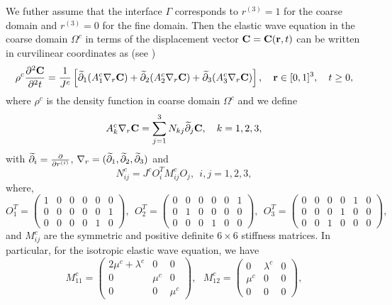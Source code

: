 We futher assume that the interface $\Gamma$ corresponds to $r^{(3)} = 1$ for the coarse domain and $r^{(3)} = 0$ for the fine domain. Then the elastic wave equation in the coarse domain $\Omega^c$ in terms of the displacement vector ${\bf C} = {\bf C}({\bf r}, t)$ can be written in curvilinear coordinates as (see \cite{petersson2015wave})
\begin{align}\label{elastic_curvi}
	\rho^c\frac{\partial^2{\bf C}}{\partial^2 t} = \frac{1}{J^c}\left[\wt{\partial}_1(A_1^c\nabla_r{\bf C}) + \wt{\partial}_2(A_2^c\nabla_r{\bf C}) +\wt{\partial}_3(A_3^c\nabla_r{\bf C}) \right],\ \ \  {\bf r}\in[0,1]^3,\ \ \  t\geq0,
\end{align}
where $\rho^c$ is the density function in coarse domain $\Omega^c$ and we define
\begin{align*} 
A_k^c\nabla_r{\bf C} = \sum_{j = 1}^3 N_{kj}\wt{\partial}_j {\bf C}, \ \ \ k = 1,2,3,
\end{align*}
with $\widetilde{\partial}_i = \frac{\partial}{\partial r^{(i)}}$, $\nabla_r = (\widetilde{\partial}_1,\widetilde{\partial}_2,\widetilde{\partial}_3)$ and
\begin{equation}\label{N_definition}
	N_{ij}^c = J^cO_i^TM_{ij}^cO_j, \ \ i,j = 1,2,3,
\end{equation}
where, 
\[ O_{1}^T = \left(\begin{array}{cccccc}
1 & 0 & 0 &0 & 0 & 0\\
0 & 0 & 0 &0 & 0 & 1\\
0 & 0 & 0 &0 & 1 & 0\end{array}\right), \ \  O_{2}^T = \left(\begin{array}{cccccc}
0 & 0 & 0 &0 & 0 & 1\\
0 & 1 & 0 &0 & 0 & 0\\
0 & 0 & 0 &1 & 0 & 0\end{array}\right),  \ \ O_{3}^T = \left(\begin{array}{cccccc}
0 & 0 & 0 &0 & 1 & 0\\
0 & 0 & 0 &1 & 0 & 0\\
0 & 0 & 1 &0 & 0 & 0\end{array}\right),\]
and $M_{ij}^c$ are the symmetric and positive definite $6\times 6$ stiffness matrices. In particular, for the isotropic elastic wave equation, we have
\[ M_{11}^c = \left(\begin{array}{ccc}
2\mu^c+\lambda^c & 0 & 0\\
0 & \mu^c & 0\\
0 & 0 & \mu^c\end{array}\right),\ \ \  M_{12}^c = \left(\begin{array}{ccc}
0 & \lambda^c & 0\\
\mu^c & 0 & 0\\
0 & 0 & 0\end{array}\right), \]
